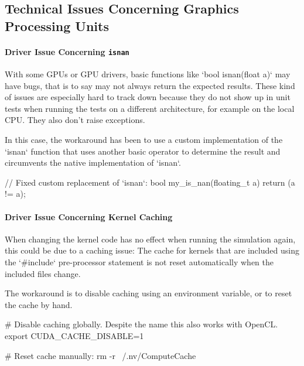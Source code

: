 
\subsection{Technical Issues Concerning Graphics Processing Units}
\label{sec:gpu_technical_issues}

\paragraph{Driver Issue Concerning \texttt{isnan}}
With some GPUs or GPU drivers, basic functions like `bool isnan(float a)` may have bugs, that is to say may not always return the expected results. These kind of issues are especially hard to track down because they do not show up in unit tests when running the tests on a different architecture, for example on the local CPU. They also don't raise exceptions.

In this case, the workaround has been to use a custom implementation of the `isnan` function that uses another basic operator to determine the result and circumvents the native implementation of `isnan`.

\begin{ccode}
// Fixed custom replacement of `isnan`:
bool my_is_nan(floating_t a) { return (a != a); }
\end{ccode}



\paragraph{Driver Issue Concerning Kernel Caching}
When changing the kernel code has no effect when running the simulation again, this could be due to a caching issue: The cache for kernels that are included using the `#include` pre-processor statement is not reset automatically when the included files change.

The workaround is to disable caching using an environment variable, or to reset the cache by hand.

\begin{bash}
# Disable caching globally. Despite the name this also works with OpenCL.
export CUDA_CACHE_DISABLE=1

# Reset cache manually:
rm -r ~/.nv/ComputeCache
\end{bash}



